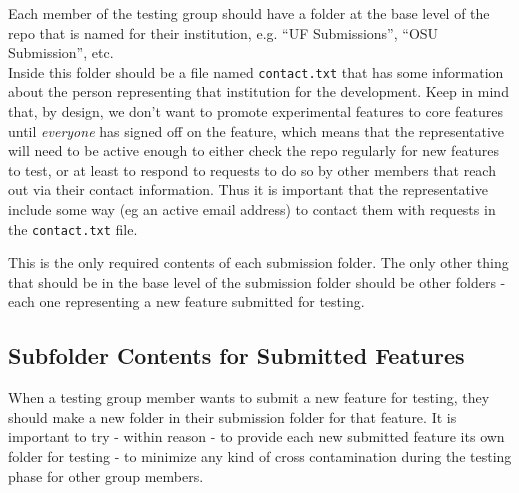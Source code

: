 \documentclass{ximera}
\begin{document}
        Each member of the testing group should have a folder at the base level of the repo that is named for their institution, e.g. ``UF Submissions'', ``OSU Submission'', etc. \\
        
        Inside this folder should be a file named \verb|contact.txt| that has some information about the person representing that institution for the development. Keep in mind that, by design, we don't want to promote experimental features to core features until \textit{everyone} has signed off on the feature, which means that the representative will need to be active enough to either check the repo regularly for new features to test, or at least to respond to requests to do so by other members that reach out via their contact information. Thus it is important that the representative include some way (eg an active email address) to contact them with requests in the \verb|contact.txt| file.
        
        This is the only required contents of each submission folder. The only other thing that should be in the base level of the submission folder should be other folders - each one representing a new feature submitted for testing.
        
    \subsection{Subfolder Contents for Submitted Features}
        
        When a testing group member wants to submit a new feature for testing, they should make a new folder in their submission folder for that feature. It is important to try - within reason - to provide each new submitted feature its own folder for testing - to minimize any kind of cross contamination during the testing phase for other group members.
        
\end{document}
